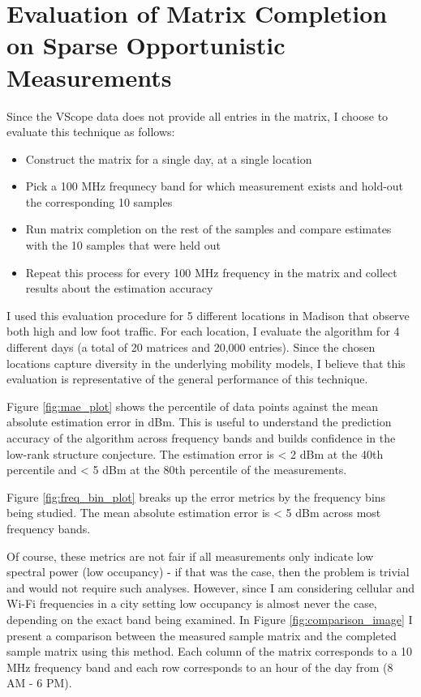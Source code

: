 \section{Evaluation of Matrix Completion on Sparse Opportunistic Measurements}

Since the VScope data does not provide all entries in the matrix, I choose to evaluate this technique as follows:

\begin{itemize}
\item Construct the matrix for a single day, at a single location
\item Pick a 100 MHz frequnecy band for which measurement exists and hold-out the corresponding 10 samples
\item Run matrix completion on the rest of the samples and compare estimates with the 10 samples that were held out
\item Repeat this process for every 100 MHz frequency in the matrix and collect results about the estimation accuracy
\end{itemize}

I used this evaluation procedure for 5 different locations in Madison that observe both high and low foot traffic.
 For each location, I evaluate the algorithm for 4 different days (a total of 20 matrices and 20,000 entries).
 Since the chosen locations capture diversity in the underlying mobility models, I believe that this evaluation is representative of the general performance of this technique.


Figure \ref{fig:mae_plot} shows the percentile of data points against the mean absolute estimation error in dBm.
 This is useful to understand the prediction accuracy of the algorithm across frequency bands and builds confidence in the low-rank structure conjecture.
 The estimation error is < 2 dBm at the 40th percentile and < 5 dBm at the 80th percentile of the measurements.


Figure \ref{fig:freq_bin_plot} breaks up the error metrics by the frequency bins being studied.
 The mean absolute estimation error is < 5 dBm across most frequency bands.


Of course, these metrics are not fair if all measurements only indicate low spectral power (low occupancy) - if that was the case, then the problem is trivial and would not require such analyses.
 However, since I am considering cellular and Wi-Fi frequencies in a city setting low occupancy is almost never the case, depending on the exact band being examined.
 In Figure \ref{fig:comparison_image} I present a comparison between the measured sample matrix and the completed sample matrix using this method.
 Each column of the matrix corresponds to a 10 MHz frequency band and each row corresponds to an hour of the day from (8 AM - 6 PM).

